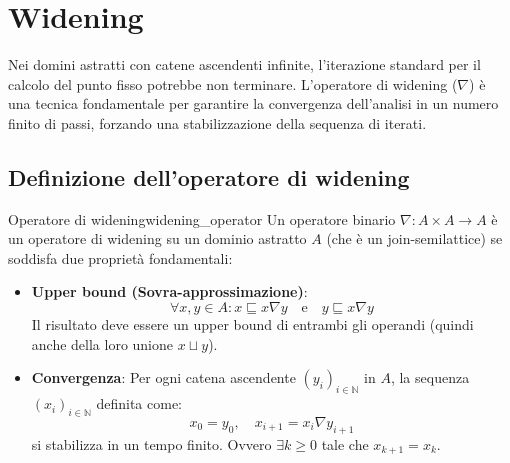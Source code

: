 \section{Widening}

Nei domini astratti con catene ascendenti infinite, l'iterazione standard
per il calcolo del punto fisso potrebbe non terminare.
L'operatore di widening ($\nabla$) è una tecnica fondamentale per garantire
la convergenza dell'analisi in un numero finito di passi, forzando una
stabilizzazione della sequenza di iterati.

\subsection{Definizione dell'operatore di widening}

\begin{definizione}{Operatore di widening}{widening_operator}
Un operatore binario $\nabla: A \times A \to A$ è un operatore di widening
su un dominio astratto $A$ (che è un join-semilattice) se soddisfa due
proprietà fondamentali:

\begin{itemize}
    \item \textbf{Upper bound (Sovra-approssimazione)}:
    \[
    \forall x,y \in A : x \sqsubseteq x \nabla y \quad \text{e} \quad y \sqsubseteq x \nabla y
    \]
    Il risultato deve essere un upper bound di entrambi gli operandi (quindi
    anche della loro unione $x \sqcup y$).

    \item \textbf{Convergenza}:
    Per ogni catena ascendente $(y_i)_{i \in \mathbb{N}}$ in $A$, la
    sequenza $(x_i)_{i \in \mathbb{N}}$ definita come:
    \[
    x_0 = y_0, \quad x_{i+1} = x_i \nabla y_{i+1}
    \]
    si stabilizza in un tempo finito.
    Ovvero $\exists k \ge 0$ tale che $x_{k+1} = x_k$.
\end{itemize}
\end{definizione}

